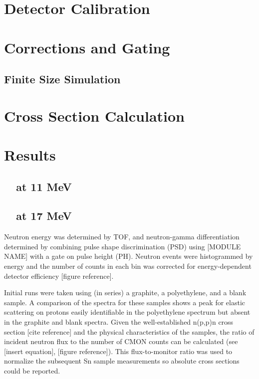 \section{Detector Calibration}
\section{Corrections and Gating}
\subsection{Finite Size Simulation}
\section{Cross Section Calculation}
\section{Results}
\subsection{\snTwelveFour\ \el\ at 11 MeV}
\subsection{\snTwelveFour\ \el\ at 17 MeV}

Neutron energy was determined by TOF, and neutron-gamma differentiation
determined by combining pulse shape discrimination (PSD) using [MODULE NAME] with
a gate on pulse height (PH). Neutron events were histogrammed by energy and the
number of counts in each bin was corrected for energy-dependent detector
efficiency [figure reference].

Initial runs were taken using (in series) a graphite, a polyethylene, and a blank
sample. A comparison of the spectra for these samples shows a peak for elastic
scattering on protons easily identifiable in the polyethylene spectrum but
absent in the graphite and blank spectra. Given the well-established n(p,p)n
cross section [cite reference] and the physical characteristics of the samples,
the ratio of incident neutron flux to the number of CMON counts can be calculated
(see [insert equation], [figure reference]). This flux-to-monitor ratio was used to normalize the
subsequent Sn sample measurements so absolute cross sections could be reported.

